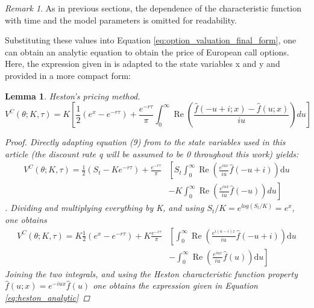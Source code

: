 \documentclass[12,twoside]{mammeTFM}
\newtheorem{lem}[thm]{Lemma}
\theoremstyle{definition}
\theoremstyle{remark}
\newtheorem{remark}[thm]{Remark}
\begin{document}
\begin{remark}
As in previous sections, the dependence of the characteristic function with time and the model parameters is omitted for readability.
\end{remark}

Substituting these values into Equation \ref{eq:option_valuation_final_form}, one can obtain an analytic equation to obtain the price of European call options. Here, the expression given in \cite{cui17} is adapted to the state variables x and y and provided in a more compact form:

\begin{lem} Heston's pricing method.
\begin{equation} \label{eq:heston_analytic}
V^{C}(\theta ; K, \tau)= K \left[ \frac{1}{2}\left(e^x- e^{-r \tau}\right) 
 + \frac{e^{-r \tau}}{\pi}\int_{0}^{\infty} \operatorname{Re}\left( \frac{\hat{f}(-u+i; x) - \hat{f}(u; x)}{i u}\right) du\right]
\end{equation}
\begin{proof}
Directly adapting equation (9) from \cite{cui17} to the state variables used in this article (the discount rate q will be assumed to be 0 throughout this work) yields:
\begin{equation}
\begin{aligned}
V^{C}(\theta ; K, \tau)= \frac{1}{2}\left(S_{t}-K e^{-r \tau}\right) + \frac{e^{-r \tau}}{\pi}& \left[  S_t \int_{0}^{\infty} \operatorname{Re}\left(\frac{e^{i u x}}{i u} \hat{f}(-u+i)\right) \mathrm{d} u\right. \\
&\left.- K \int_{0}^{\infty} \operatorname{Re}\left(\frac{e^{i u x}}{i u} \hat{f}(-u)\right) du\right]
\end{aligned}
\end{equation}
. Dividing and multiplying everything by K, and using $S_t/K = e^{log(S_t/K)} = e^x$, one obtains
\begin{equation}
\begin{aligned}
V^{C}(\theta ; K, \tau)= K \frac{1}{2}\left(e^x- e^{-r \tau}\right) + K\frac{e^{-r \tau}}{\pi}& \left[\int_{0}^{\infty} \operatorname{Re}\left(\frac{e^{i (u - i) x}}{i u} \hat{f}(-u+i)\right) \mathrm{d} u\right. \\
&\left.- \int_{0}^{\infty} \operatorname{Re}\left(\frac{e^{i u x}}{i u} \hat{f}(u)\right) \mathrm{d} u\right]
\end{aligned}
\end{equation}
Joining the two integrals, and using the Heston characteristic function property $\hat{f}(u; x) = e^{-iu x}\hat{f}(u)$ one obtains the expression given in Equation \ref{eq:heston_analytic}
\end{proof}
\end{lem}
\end{document}
